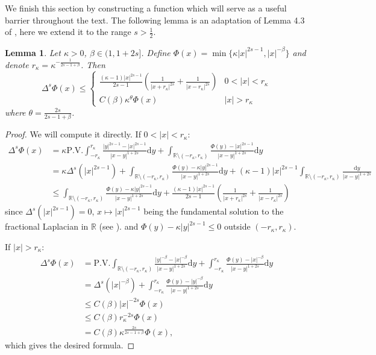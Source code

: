 \documentclass[11pt,a4paper]{amsart}
\newcommand{\R}{\mathbb{R}}
\newcommand{\PV}{\mathrm{P.V.}}
\newcommand{\dy}{\mathrm{d}y}
\newtheorem{lem}[thm]{Lemma}
\begin{document}
We finish this section by constructing a function which will serve as a useful barrier throughout the text. The following lemma is an adaptation of Lemma 4.3 of \cite{DQT23}, here we extend it to the range $s>\frac12$. 
\begin{lem}
\label{lem:trunc_fs}
Let $\kappa > 0$, $\beta \in (1,1+2s]$. Define $\Phi(x) = \min\{\kappa|x|^{2s-1}, |x|^{-\beta}\}$ and denote $r_{\kappa} = \kappa^{-\frac{1}{2s-1+\beta}}$. Then
\[\Delta^s\Phi(x) \leq \begin{cases}
\frac{(\kappa -1) |x|^{2s-1}}{2s-1}\left( \frac{1}{|x+r_{\kappa}|^{2s}} + \frac{1}{|x-r_{\kappa}|^{2s}} \right) & 0<|x|<r_{\kappa} \\
C(\beta)\kappa^{\theta}\Phi(x) & |x| > r_{\kappa}
\end{cases}\]
where $\theta = \frac{2s}{2s-1+\beta}$. 
\end{lem}

\begin{proof}
We will compute it directly. If $0 < |x| < r_{\kappa}$:
\begin{align*}
\Delta^s \Phi(x) &= \kappa \PV \int_{-r_{\kappa}}^{r_{\kappa}} \frac{|y|^{2s-1} - |x|^{2s-1}}{|x-y|^{1+2s}} \dy +  \int_{\R\setminus (-r_{\kappa}, r_{\kappa})} \frac{\Phi(y) - |x|^{2s-1}}{|x-y|^{1+2s}}\dy\\
&=\kappa \Delta^s(|x|^{2s-1}) + \int_{\R\setminus(-r_{\kappa},r_{\kappa})} \frac{\Phi(y) - \kappa|y|^{2s-1}}{|x-y|^{1+2s}}\dy + (\kappa-1)|x|^{2s-1} \int_{\R\setminus(-r_{\kappa},r_{\kappa})} \frac{\dy}{|x-y|^{1+2s}} \\
&\leq \int_{\R\setminus(-r_{\kappa},r_{\kappa})} \frac{\Phi(y) - \kappa|y|^{2s-1}}{|x-y|^{1+2s}}\dy + \frac{(\kappa -1) |x|^{2s-1}}{2s-1}\left( \frac{1}{|x+r_{\kappa}|^{2s}} + \frac{1}{|x-r_{\kappa}|^{2s}} \right)
\end{align*}
since $\Delta^s(|x|^{2s-1}) =0$, $x\mapsto |x|^{2s-1}$ being the fundamental solution to the fractional Laplacian in $\R$ (see \cite{CS07}). and $\Phi(y) - \kappa|y|^{2s-1}\leq 0$ outside $(-r_{\kappa}, r_{\kappa})$.

If $|x|>r_{\kappa}$:
\begin{align*}
\Delta^s \Phi(x) &= \PV \int_{\R\setminus (-r_{\kappa}, r_{\kappa})} \frac{|y|^{-\beta} - |x|^{-\beta}}{|x-y|^{1+2s}} \dy +  \int_{-r_{\kappa}}^{r_{\kappa}} \frac{\Phi(y) - |x|^{-\beta}}{|x-y|^{1+2s}}\dy\\
&= \Delta^s(|x|^{-\beta}) + \int_{-r_{\kappa}}^{r_{\kappa}} \frac{\Phi(y) - |y|^{-\beta}}{|x-y|^{1+2s}}\dy \\
&\leq C(\beta) |x|^{-2s}\Phi(x) \\
&\leq C(\beta) r_{\kappa}^{-2s} \Phi(x) \\
&= C(\beta) \kappa^{\frac{2s}{2s-1+\beta}}\Phi(x),
\end{align*}
which gives the desired formula.
\end{proof}
\end{document}
